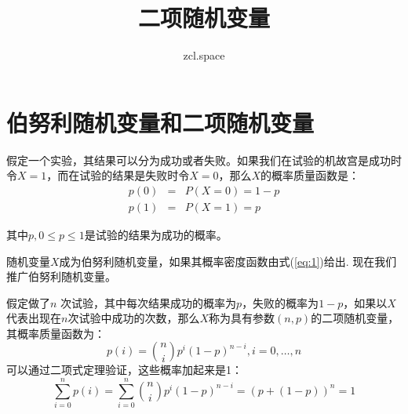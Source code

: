 \documentclass[10pt,a4paper,UTF8]{article}
\author{zcl.space}
\date{}
\title{二项随机变量}
\begin{document}
\maketitle
\tableofcontents
{}


\section{伯努利随机变量和二项随机变量}
\label{sec:org98f4d9f}


假定一个实验，其结果可以分为成功或者失败。如果我们在试验的机故宫是成功时令\(X=1\)，而在试验的结果是失败时令\(X=0\)，那么\(X\)的概率质量函数是：
\begin{eqnarray}
\label{eq:1}
p(0)&=&P(X = 0) = 1-p \\
p(1)&=&P(X = 1) = p
\end{eqnarray}

其中\(p,0\leq p \leq 1\)是试验的结果为成功的概率。

随机变量\(X\)成为伯努利随机变量，如果其概率密度函数由式(\ref{eq:1})给出. 现在我们推广伯努利随机变量。

假定做了\(n\) 次试验，其中每次结果成功的概率为\(p\)，失败的概率为\(1-p\)，如果以\(X\)代表出现在\(n\)次试验中成功的次数，那么\(X\)称为具有参数\((n,p)\)的二项随机变量，其概率质量函数为：
\begin{equation}
\label{eq:2}
p(i) = \binom{n}{i}p^{i}(1-p)^{n-i}, i = 0,\ldots ,n
\end{equation}
可以通过二项式定理验证，这些概率加起来是1：
\begin{equation}
\label{eq:3}
\sum_{i=0}^{n}p(i) = \sum_{i=0}^{n} \binom{n}{i}p^{i}(1-p)^{n-i} = (p + (1-p))^{n} = 1
\end{equation}
\end{document}
